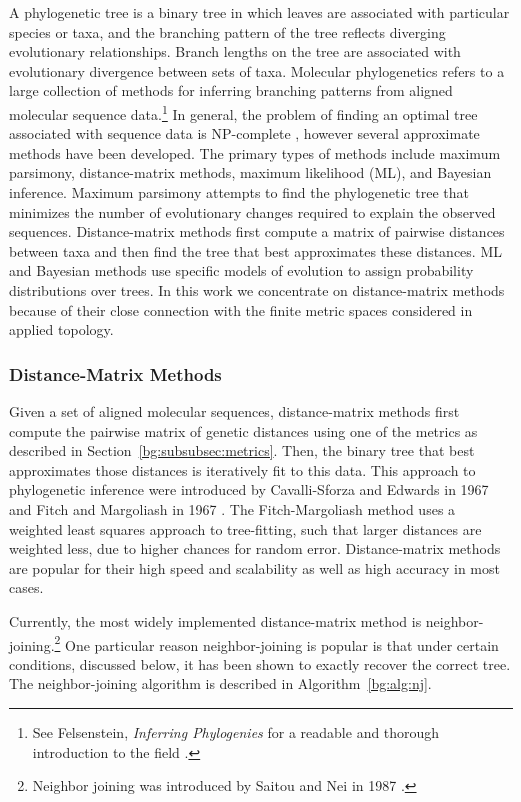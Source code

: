 A phylogenetic tree is a binary tree in which leaves are associated with particular species or taxa, and the branching pattern of the tree reflects diverging evolutionary relationships.
Branch lengths on the tree are associated with evolutionary divergence between sets of taxa.
Molecular phylogenetics refers to a large collection of methods for inferring branching patterns from aligned molecular sequence data.\footnote{See Felsenstein, \emph{Inferring Phylogenies} for a readable and thorough introduction to the field \cite{Felsenstein:2004ws}.}
In general, the problem of finding an optimal tree associated with sequence data is NP-complete \cite{Foulds:1982fn}, however several approximate methods have been developed.
The primary types of methods include maximum parsimony, distance-matrix methods, maximum likelihood (ML), and Bayesian inference.
Maximum parsimony attempts to find the phylogenetic tree that minimizes the number of evolutionary changes required to explain the observed sequences.
Distance-matrix methods first compute a matrix of pairwise distances between taxa and then find the tree that best approximates these distances.
ML and Bayesian methods use specific models of evolution to assign probability distributions over trees.
In this work we concentrate on distance-matrix methods because of their close connection with the finite metric spaces considered in applied topology.

\subsubsection{Distance-Matrix Methods}

Given a set of aligned molecular sequences, distance-matrix methods first compute the pairwise matrix of genetic distances using one of the metrics as described in Section~\ref{bg:subsubsec:metrics}.
Then, the binary tree that best approximates those distances is iteratively fit to this data.
This approach to phylogenetic inference were introduced by Cavalli-Sforza and Edwards in 1967 \cite{CavalliSforza:1967th} and Fitch and Margoliash in 1967 \cite{Fitch:1967we}.
The Fitch-Margoliash method uses a weighted least squares approach to tree-fitting, such that larger distances are weighted less, due to higher chances for random error.
Distance-matrix methods are popular for their high speed and scalability as well as high accuracy in most cases.

Currently, the most widely implemented distance-matrix method is neighbor-joining.\footnote{Neighbor joining was introduced by Saitou and Nei in 1987 \cite{Saitou:1987wo}.}
One particular reason neighbor-joining is popular is that under certain conditions, discussed below, it has been shown to exactly recover the correct tree.
The neighbor-joining algorithm is described in Algorithm~\ref{bg:alg:nj}.

